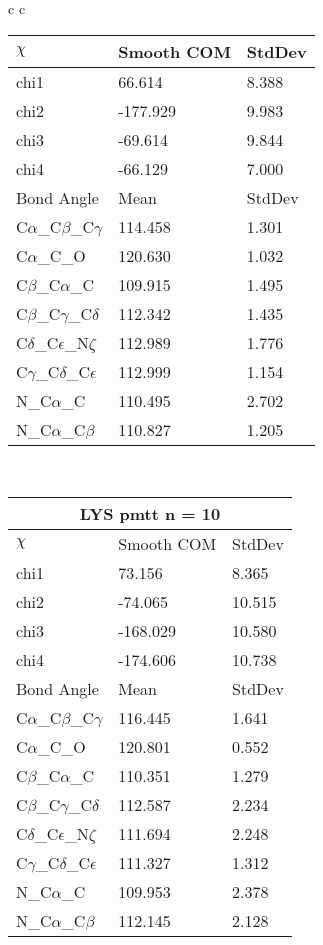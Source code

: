 \begin{longtable}{ c c }
\begin{tabular}{ l l l }
  $\chi$       & Smooth COM & StdDev \\ \midrule
  chi1 & 66.614 & 8.388 \\ 
  chi2 & -177.929 & 9.983 \\ 
  chi3 & -69.614 & 9.844 \\ 
  chi4 & -66.129 & 7.000 \\ \midrule
  Bond Angle   & Mean     & StdDev \\ \midrule
  C$\alpha$\_C$\beta$\_C$\gamma$ & 114.458 & 1.301\\
  C$\alpha$\_C\_O & 120.630 & 1.032\\
  C$\beta$\_C$\alpha$\_C & 109.915 & 1.495\\
  C$\beta$\_C$\gamma$\_C$\delta$ & 112.342 & 1.435\\
  C$\delta$\_C$\epsilon$\_N$\zeta$ & 112.989 & 1.776\\
  C$\gamma$\_C$\delta$\_C$\epsilon$ & 112.999 & 1.154\\
  N\_C$\alpha$\_C & 110.495 & 2.702\\
  N\_C$\alpha$\_C$\beta$ & 110.827 & 1.205\\
  \bottomrule
  \end{tabular}
  \\
  \begin{tabular}{ l l l }
  \toprule
  \multicolumn{3}{c}{LYS \textbf{pmtt} n = 10} \\ \toprule
  $\chi$       & Smooth COM & StdDev \\ \midrule
  chi1 & 73.156 & 8.365 \\ 
  chi2 & -74.065 & 10.515 \\ 
  chi3 & -168.029 & 10.580 \\ 
  chi4 & -174.606 & 10.738 \\ \midrule
  Bond Angle   & Mean     & StdDev \\ \midrule
  C$\alpha$\_C$\beta$\_C$\gamma$ & 116.445 & 1.641\\
  C$\alpha$\_C\_O & 120.801 & 0.552\\
  C$\beta$\_C$\alpha$\_C & 110.351 & 1.279\\
  C$\beta$\_C$\gamma$\_C$\delta$ & 112.587 & 2.234\\
  C$\delta$\_C$\epsilon$\_N$\zeta$ & 111.694 & 2.248\\
  C$\gamma$\_C$\delta$\_C$\epsilon$ & 111.327 & 1.312\\
  N\_C$\alpha$\_C & 109.953 & 2.378\\
  N\_C$\alpha$\_C$\beta$ & 112.145 & 2.128\\

\end{tabular}
\end{longtable}
